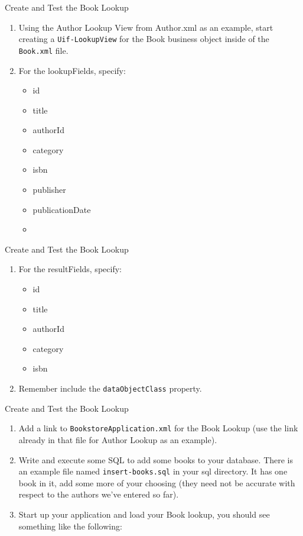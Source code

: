 \documentclass[xcolor=dvipsnames,14pt,professionalfonts]{beamer}
\begin{document}
    \begin{frame}{Create and Test the Book Lookup}
      \begin{enumerate}
        \item Using the Author Lookup View from Author.xml as an example, start creating a \texttt{Uif-LookupView} for the Book business object inside of the \texttt{Book.xml} file.
        \item For the lookupFields, specify:
          \begin{itemize}
            \item id
            \item title
            \item authorId
            \item category
            \item isbn
            \item publisher
            \item publicationDate
            \item 
            \end{itemize}
          \end{enumerate}
        \end{frame}

        \begin{frame}{Create and Test the Book Lookup}
          \begin{enumerate}
          \item For the resultFields, specify:
            \begin{itemize}
              \item id
            \item title
            \item authorId
            \item category
            \item isbn
            \end{itemize}
          \item Remember include the \texttt{dataObjectClass} property.
            \end{enumerate}
          \end{frame}
          
          \begin{frame}{Create and Test the Book Lookup}
            \begin{enumerate}
              \item Add a link to \texttt{BookstoreApplication.xml} for the Book Lookup (use the link already in that file for Author Lookup as an example).
              \item Write and execute some SQL to add some books to your database.  There is an example file named \texttt{insert-books.sql} in your sql directory.  It has one book in it, add some more of your choosing (they need not be accurate with respect to the authors we’ve entered so far).
              \item Start up your application and load your Book
                lookup, you should see something like the following:
              \end{enumerate}
            \end{frame}
\end{document}

